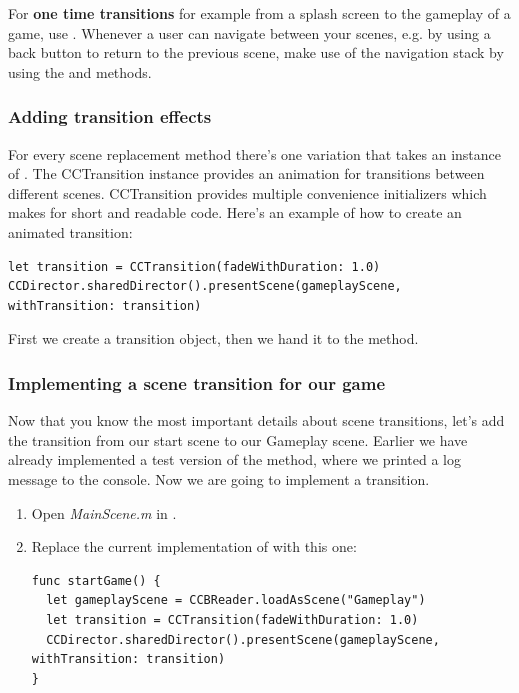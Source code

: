 \begin{details} 
For \textbf{one time transitions} for example from a splash screen to the
gameplay of a game, use . Whenever a user can navigate
between your scenes, e.g. by using a back button to return to the previous
scene, make use of the navigation stack by using the  and
 methods.
\end{details}

\subsubsection{Adding transition effects}
For every scene replacement method there's one variation that takes an instance
of . The CCTransition instance provides an animation
for transitions between different scenes. CCTransition provides multiple
convenience initializers which makes for short and readable code. Here's an
example of how to create an animated transition:
\begin{lstlisting}
let transition = CCTransition(fadeWithDuration: 1.0)
CCDirector.sharedDirector().presentScene(gameplayScene, withTransition: transition)
\end{lstlisting}
First we create a transition object, then we hand it to the
 method.

\subsubsection{Implementing a scene transition for our game}
Now that you know the most important details about scene transitions, let's add
the transition from our start scene to our Gameplay scene. Earlier we have already implemented a test
version of the  method, where we printed a log message to
the console. Now we are going to implement a transition.  

\begin{leftbar}
\begin{enumerate}
\item Open \textit{MainScene.m} in \xcode{}. 
\item Replace the current implementation of  with this one:
\begin{lstlisting}
func startGame() {
  let gameplayScene = CCBReader.loadAsScene("Gameplay")
  let transition = CCTransition(fadeWithDuration: 1.0)
  CCDirector.sharedDirector().presentScene(gameplayScene, withTransition: transition)
}
\end{lstlisting}
\end{enumerate}
\end{leftbar}

